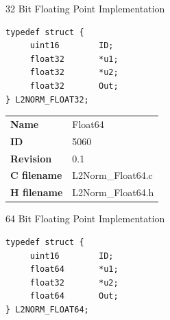 32 Bit Floating Point Implementation

\begin{lstlisting}
typedef struct {
     uint16        ID;
     float32       *u1;
     float32       *u2;
     float32       Out;
} L2NORM_FLOAT32;
\end{lstlisting}

\ifdefined \AddTestReports
{}
\fi
{}
\nopagebreak[0]
\begin{tabular}{l l}
\textbf{Name} & Float64 \tabularnewline
\textbf{ID} & 5060 \tabularnewline
\textbf{Revision} & 0.1 \tabularnewline
\textbf{C filename} & L2Norm\_Float64.c \tabularnewline
\textbf{H filename} & L2Norm\_Float64.h \tabularnewline
\end{tabular}
\vspace{1ex}

64 Bit Floating Point Implementation

\begin{lstlisting}
typedef struct {
     uint16        ID;
     float64       *u1;
     float32       *u2;
     float64       Out;
} L2NORM_FLOAT64;
\end{lstlisting}

\ifdefined \AddTestReports
{}
\fi
